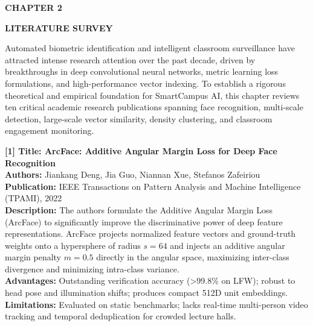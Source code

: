 \newpage
\begin{flushleft}
{\fontsize{16pt}{16pt}\selectfont \textbf{CHAPTER 2}}
\end{flushleft}		
\begin{center}
{\fontsize{18pt}{22pt}\selectfont \textbf{LITERATURE SURVEY}}\\[2mm]
\end{center}

\onehalfspacing
\justifying
\noindent Automated biometric identification and intelligent classroom surveillance have attracted intense research attention over the past decade, driven by breakthroughs in deep convolutional neural networks, metric learning loss formulations, and high-performance vector indexing. To establish a rigorous theoretical and empirical foundation for SmartCampus AI, this chapter reviews ten critical academic research publications spanning face recognition, multi-scale detection, large-scale vector similarity, density clustering, and classroom engagement monitoring.

\vspace{0.2in}
\begin{flushleft}
{\fontsize{12pt}{14pt}\selectfont \textbf{[1] Title: ArcFace: Additive Angular Margin Loss for Deep Face Recognition}} \\
\textbf{Authors:} Jiankang Deng, Jia Guo, Niannan Xue, Stefanos Zafeiriou \\
\textbf{Publication:} IEEE Transactions on Pattern Analysis and Machine Intelligence (TPAMI), 2022 \\
\textbf{Description:} The authors formulate the Additive Angular Margin Loss (ArcFace) to significantly improve the discriminative power of deep feature representations. ArcFace projects normalized feature vectors and ground-truth weights onto a hypersphere of radius $s=64$ and injects an additive angular margin penalty $m=0.5$ directly in the angular space, maximizing inter-class divergence and minimizing intra-class variance. \\
\textbf{Advantages:} Outstanding verification accuracy (>99.8\% on LFW); robust to head pose and illumination shifts; produces compact 512D unit embeddings. \\
\textbf{Limitations:} Evaluated on static benchmarks; lacks real-time multi-person video tracking and temporal deduplication for crowded lecture halls.
\end{flushleft}

